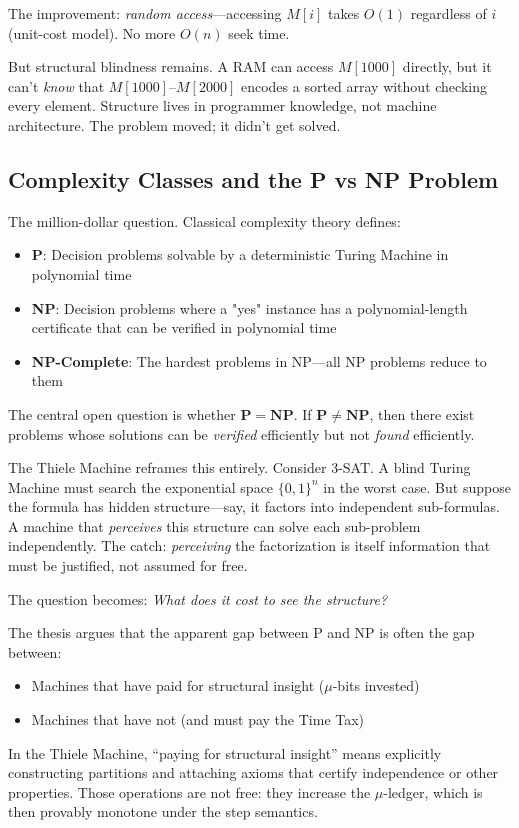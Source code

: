The improvement: \textit{random access}---accessing $M[i]$ takes $O(1)$ regardless of $i$ (unit-cost model). No more $O(n)$ seek time.

But structural blindness remains. A RAM can access $M[1000]$ directly, but it can't \emph{know} that $M[1000]$--$M[2000]$ encodes a sorted array without checking every element. Structure lives in programmer knowledge, not machine architecture. The problem moved; it didn't get solved.

\subsection{Complexity Classes and the P vs NP Problem}

The million-dollar question. Classical complexity theory defines:
\begin{itemize}
    \item \textbf{P}: Decision problems solvable by a deterministic Turing Machine in polynomial time
    \item \textbf{NP}: Decision problems where a "yes" instance has a polynomial-length certificate that can be verified in polynomial time
    \item \textbf{NP-Complete}: The hardest problems in NP—all NP problems reduce to them
\end{itemize}

The central open question is whether $\mathbf{P} = \mathbf{NP}$. If $\mathbf{P} \neq \mathbf{NP}$, then there exist problems whose solutions can be \textit{verified} efficiently but not \textit{found} efficiently.

The Thiele Machine reframes this entirely. Consider 3-SAT. A blind Turing Machine must search the exponential space $\{0,1\}^n$ in the worst case. But suppose the formula has hidden structure---say, it factors into independent sub-formulas. A machine that \textit{perceives} this structure can solve each sub-problem independently. The catch: \emph{perceiving} the factorization is itself information that must be justified, not assumed for free.

The question becomes: \textit{What does it cost to see the structure?}

The thesis argues that the apparent gap between P and NP is often the gap between:
\begin{itemize}
    \item Machines that have paid for structural insight ($\mu$-bits invested)
    \item Machines that have not (and must pay the Time Tax)
\end{itemize}
In the Thiele Machine, “paying for structural insight” means explicitly constructing partitions and attaching axioms that certify independence or other properties. Those operations are not free: they increase the $\mu$-ledger, which is then provably monotone under the step semantics.

